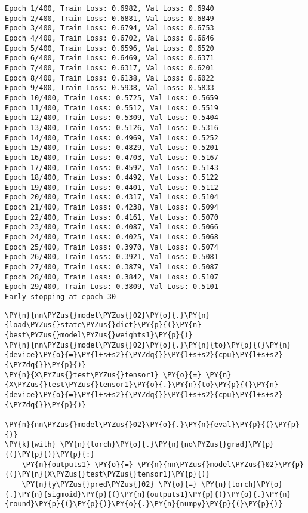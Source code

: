     \begin{Verbatim}[commandchars=\\\{\}]
Epoch 1/400, Train Loss: 0.6982, Val Loss: 0.6940
Epoch 2/400, Train Loss: 0.6881, Val Loss: 0.6849
Epoch 3/400, Train Loss: 0.6794, Val Loss: 0.6753
Epoch 4/400, Train Loss: 0.6702, Val Loss: 0.6646
Epoch 5/400, Train Loss: 0.6596, Val Loss: 0.6520
Epoch 6/400, Train Loss: 0.6469, Val Loss: 0.6371
Epoch 7/400, Train Loss: 0.6317, Val Loss: 0.6201
Epoch 8/400, Train Loss: 0.6138, Val Loss: 0.6022
Epoch 9/400, Train Loss: 0.5938, Val Loss: 0.5833
Epoch 10/400, Train Loss: 0.5725, Val Loss: 0.5659
Epoch 11/400, Train Loss: 0.5512, Val Loss: 0.5519
Epoch 12/400, Train Loss: 0.5309, Val Loss: 0.5404
Epoch 13/400, Train Loss: 0.5126, Val Loss: 0.5316
Epoch 14/400, Train Loss: 0.4969, Val Loss: 0.5252
Epoch 15/400, Train Loss: 0.4829, Val Loss: 0.5201
Epoch 16/400, Train Loss: 0.4703, Val Loss: 0.5167
Epoch 17/400, Train Loss: 0.4592, Val Loss: 0.5143
Epoch 18/400, Train Loss: 0.4492, Val Loss: 0.5122
Epoch 19/400, Train Loss: 0.4401, Val Loss: 0.5112
Epoch 20/400, Train Loss: 0.4317, Val Loss: 0.5104
Epoch 21/400, Train Loss: 0.4238, Val Loss: 0.5094
Epoch 22/400, Train Loss: 0.4161, Val Loss: 0.5070
Epoch 23/400, Train Loss: 0.4087, Val Loss: 0.5066
Epoch 24/400, Train Loss: 0.4025, Val Loss: 0.5068
Epoch 25/400, Train Loss: 0.3970, Val Loss: 0.5074
Epoch 26/400, Train Loss: 0.3921, Val Loss: 0.5081
Epoch 27/400, Train Loss: 0.3879, Val Loss: 0.5087
Epoch 28/400, Train Loss: 0.3842, Val Loss: 0.5107
Epoch 29/400, Train Loss: 0.3809, Val Loss: 0.5101
Early stopping at epoch 30
    \end{Verbatim}

    \begin{tcolorbox}[breakable, size=fbox, boxrule=1pt, pad at break*=1mm,colback=cellbackground, colframe=cellborder]
\begin{Verbatim}[commandchars=\\\{\}]
\PY{n}{nn\PYZus{}model\PYZus{}02}\PY{o}{.}\PY{n}{load\PYZus{}state\PYZus{}dict}\PY{p}{(}\PY{n}{best\PYZus{}model\PYZus{}weights1}\PY{p}{)}
\PY{n}{nn\PYZus{}model\PYZus{}02}\PY{o}{.}\PY{n}{to}\PY{p}{(}\PY{n}{device}\PY{o}{=}\PY{l+s+s2}{\PYZdq{}}\PY{l+s+s2}{cpu}\PY{l+s+s2}{\PYZdq{}}\PY{p}{)}
\PY{n}{X\PYZus{}test\PYZus{}tensor1} \PY{o}{=} \PY{n}{X\PYZus{}test\PYZus{}tensor1}\PY{o}{.}\PY{n}{to}\PY{p}{(}\PY{n}{device}\PY{o}{=}\PY{l+s+s2}{\PYZdq{}}\PY{l+s+s2}{cpu}\PY{l+s+s2}{\PYZdq{}}\PY{p}{)}

\PY{n}{nn\PYZus{}model\PYZus{}02}\PY{o}{.}\PY{n}{eval}\PY{p}{(}\PY{p}{)}
\PY{k}{with} \PY{n}{torch}\PY{o}{.}\PY{n}{no\PYZus{}grad}\PY{p}{(}\PY{p}{)}\PY{p}{:}
    \PY{n}{outputs1} \PY{o}{=} \PY{n}{nn\PYZus{}model\PYZus{}02}\PY{p}{(}\PY{n}{X\PYZus{}test\PYZus{}tensor1}\PY{p}{)}
    \PY{n}{y\PYZus{}pred\PYZus{}02} \PY{o}{=} \PY{n}{torch}\PY{o}{.}\PY{n}{sigmoid}\PY{p}{(}\PY{n}{outputs1}\PY{p}{)}\PY{o}{.}\PY{n}{round}\PY{p}{(}\PY{p}{)}\PY{o}{.}\PY{n}{numpy}\PY{p}{(}\PY{p}{)}
\end{Verbatim}
\end{tcolorbox}

